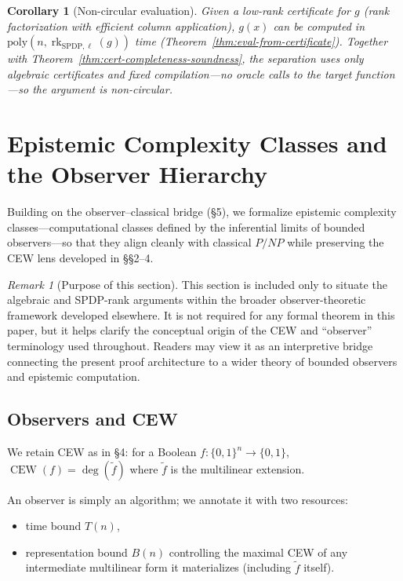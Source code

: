 \documentclass[12pt]{article}
\newtheorem{corollary}[theorem]{Corollary}
\theoremstyle{definition}
\theoremstyle{definition}
\theoremstyle{remark}
\newtheorem{remark}{Remark}
\theoremstyle{remark}
\begin{document}
\begin{corollary}[Non-circular evaluation]\label{cor:non-circular}
Given a low-rank certificate for $g$ (rank factorization with efficient column application), $g(x)$ can be computed in $\mathrm{poly}(n,\operatorname{rk}_{\mathrm{SPDP},\ell}(g))$ time (Theorem~\ref{thm:eval-from-certificate}). Together with Theorem~\ref{thm:cert-completeness-soundness}, the separation uses only algebraic certificates and fixed compilation---no oracle calls to the target function---so the argument is non-circular.
\end{corollary}

\section{Epistemic Complexity Classes and the Observer Hierarchy}
\label{sec:epistemic-complexity}

Building on the observer--classical bridge (\S5), we formalize epistemic complexity classes---computational classes defined by the inferential limits of bounded observers---so that they align cleanly with classical $P/NP$ while preserving the CEW lens developed in \S\S2--4.

\begin{remark}[Purpose of this section]
This section is included only to situate the algebraic and SPDP-rank arguments within the broader observer-theoretic framework developed elsewhere.
It is not required for any formal theorem in this paper, but it helps clarify the conceptual origin of the CEW and ``observer'' terminology used throughout.
Readers may view it as an interpretive bridge connecting the present proof architecture to a wider theory of bounded observers and epistemic computation.
\end{remark}

\subsection{Observers and CEW}

We retain CEW as in \S4: for a Boolean $f:\{0,1\}^n\to\{0,1\}$, $\operatorname{CEW}(f)=\deg(\tilde f)$ where $\tilde f$ is the multilinear extension.

An observer is simply an algorithm; we annotate it with two resources:
\begin{itemize}
\item time bound $T(n)$,
\item representation bound $B(n)$ controlling the maximal CEW of any intermediate multilinear form it materializes (including $\tilde f$ itself).
\end{itemize}
\end{document}
